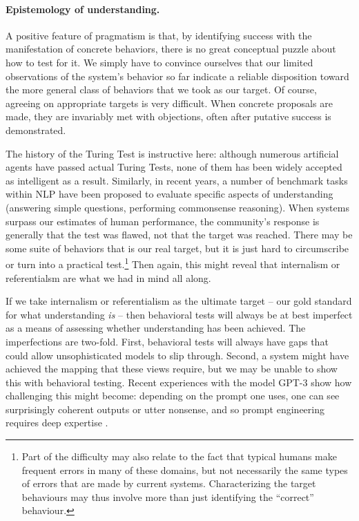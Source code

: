 \paragraph{Epistemology of understanding.} 

A positive feature of pragmatism is that, by identifying success with the manifestation of concrete behaviors, there is no great conceptual puzzle about how to test for it. We simply have to convince ourselves that our limited observations of the system’s behavior so far indicate a reliable disposition toward the more general class of behaviors that we took as our target. Of course, agreeing on appropriate targets is very difficult. When concrete proposals are made, they are invariably met with objections, often after putative success is demonstrated.

The history of the Turing Test is instructive here: although numerous artificial agents have passed actual Turing Tests, none of them has been widely accepted as intelligent as a result. Similarly, in recent years, a number of benchmark tasks within NLP have been proposed to evaluate specific aspects of understanding (\eg answering simple questions, performing commonsense reasoning). When systems surpass our estimates of human performance, the community’s response is generally that the test was flawed, not that the target was reached. There may be some suite of behaviors that is our real target, but it is just hard to circumscribe or turn into a practical test.\footnote{Part of the difficulty may also relate to the fact that typical humans make frequent errors in many of these domains, but not necessarily the same types of errors that are made by current systems. Characterizing the target behaviours may thus involve more than just identifying the ``correct'' behaviour.} Then again, this might reveal that internalism or referentialsm are what we had in mind all along.

If we take internalism or referentialism as the ultimate target – our gold standard for what understanding \textit{is} – then behavioral tests will always be at best imperfect as a means of assessing whether understanding has been achieved. The imperfections are two-fold. First, behavioral tests will always have gaps that could allow unsophisticated models to slip through. Second, a system might have achieved the mapping that these views require, but we may be unable to show this with behavioral testing. Recent experiences with the model GPT-3 show how challenging this might become: depending on the prompt one uses, one can see surprisingly coherent outputs or utter nonsense, and so prompt engineering requires deep expertise \citep{rong2021extrapolating}.

